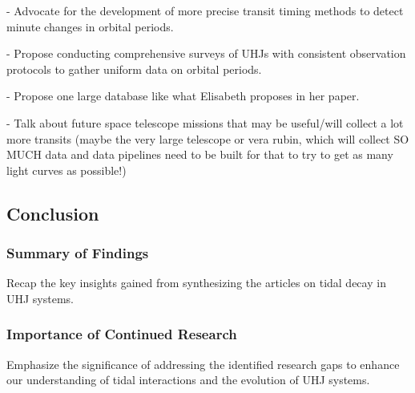 \documentclass[oneside,12pt]{amsart}
\numberwithin{page}{section}
\begin{document}
- Advocate for the development of more precise transit timing methods to detect minute changes in orbital periods.

- Propose conducting comprehensive surveys of UHJs with consistent observation protocols to gather uniform data on orbital periods.

- Propose one large database like what Elisabeth proposes in her paper.

- Talk about future space telescope missions that may be useful/will collect a lot more transits (maybe the very large telescope or vera rubin, which will collect SO MUCH data and data pipelines need to be built for that to try to get as many light curves as possible!)

\clearpage 


\subsection{Conclusion}

\subsubsection{Summary of Findings}
Recap the key insights gained from synthesizing the articles on tidal decay in UHJ systems.

\subsubsection{Importance of Continued Research}
Emphasize the significance of addressing the identified research gaps to enhance our understanding of tidal interactions and the evolution of UHJ systems.

\clearpage








\end{document}
